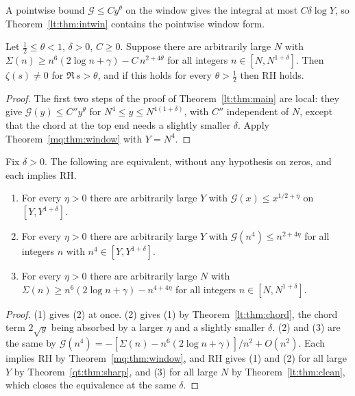 A pointwise bound $\mathcal G\le Cy^\theta$ on the window gives the integral at most $C\delta\log Y$, so Theorem~\ref{lt:thm:intwin} contains the pointwise window form.

\begin{theorem}\label{lt:thm:mainwin}
Let $\tfrac12\le\theta<1$, $\delta>0$, $C\ge0$. Suppose there are arbitrarily large $N$ with $\Sigma(n)\ge n^6(2\log n+\gamma)-C\,n^{2+4\theta}$ for all integers $n\in[N,N^{1+\delta}]$. Then $\zeta(s)\ne0$ for $\Re\,s>\theta$, and if this holds for every $\theta>\tfrac12$ then RH holds.
\end{theorem}

\begin{proof}
The first two steps of the proof of Theorem~\ref{lt:thm:main} are local: they give $\mathcal G(y)\le C''y^\theta$ for $N^4\le y\le N^{4(1+\delta)}$, with $C''$ independent of $N$, except that the chord at the top end needs a slightly smaller $\delta$. Apply Theorem~\ref{mq:thm:window} with $Y=N^4$.
\end{proof}

\begin{proposition}\label{lt:prop:three}
Fix $\delta>0$. The following are equivalent, without any hypothesis on zeros, and each implies RH.
\begin{enumerate}
\item For every $\eta>0$ there are arbitrarily large $Y$ with $\mathcal G(x)\le x^{1/2+\eta}$ on $[Y,Y^{1+\delta}]$.
\item For every $\eta>0$ there are arbitrarily large $Y$ with $\mathcal G(n^4)\le n^{2+4\eta}$ for all integers $n$ with $n^4\in[Y,Y^{1+\delta}]$.
\item For every $\eta>0$ there are arbitrarily large $N$ with $\Sigma(n)\ge n^6(2\log n+\gamma)-n^{4+4\eta}$ for all integers $n\in[N,N^{1+\delta}]$.
\end{enumerate}
\end{proposition}

\begin{proof}
(1) gives (2) at once. (2) gives (1) by Theorem~\ref{lt:thm:chord}, the chord term $2\sqrt y$ being absorbed by a larger $\eta$ and a slightly smaller $\delta$. (2) and (3) are the same by $\mathcal G(n^4)=-[\Sigma(n)-n^6(2\log n+\gamma)]/n^2+O(n^2)$. Each implies RH by Theorem~\ref{mq:thm:window}, and RH gives (1) and (2) for all large $Y$ by Theorem~\ref{qt:thm:sharp}, and (3) for all large $N$ by Theorem~\ref{lt:thm:clean}, which closes the equivalence at the same $\delta$.
\end{proof}

